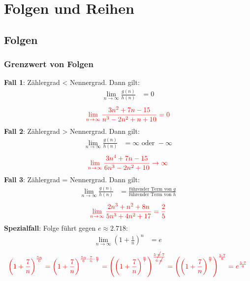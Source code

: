 \section{Folgen und Reihen}
\subsection{Folgen}

\subsubsection{Grenzwert von Folgen}
\textbf{Fall 1}: Zählergrad < Nennergrad. Dann gilt:
\begin{align*}
	\lim_{n \to \infty} \frac{g(n)}{h(n)} & = 0
\end{align*}
\begin{align*}
	\textcolor{red}{\lim_{n \to \infty} \frac{3n^2 + 7n - 15}{n^3 - 2n^2 + n + 10} = 0}
\end{align*}
\textbf{Fall 2}: Zählergrad > Nennergrad. Dann gilt:
\begin{align*}
	\lim_{n \to \infty} \frac{g(n)}{h(n)} & = \infty \text{ oder } -\infty
\end{align*}
\begin{align*}
	\textcolor{red}{\lim_{n \to \infty} \frac{3n^4 + 7n - 15}{6n^3 - 2n^2 + 10} \to \infty}
\end{align*}
\textbf{Fall 3}: Zählergrad = Nennergrad. Dann gilt:
\begin{align*}
	\lim_{n \to \infty} \frac{g(n)}{h(n)} & = \frac{\text{führender Term von } g}{\text{führender Term von } h}
\end{align*}
\begin{align*}
	\textcolor{red}{\lim_{n \to \infty} \frac{2n^3 + n^2 + 8n}{5n^3 + 4n^2 + 17} = \frac{2}{5}}
\end{align*}
\textbf{Spezialfall}: Folge führt gegen $e \approx 2.718$:
\begin{align*}
	\lim_{n \to \infty} (1+\frac{1}{n})^n & = e
\end{align*}
\begin{align*}
	\textcolor{red}{\left(1 + \frac{7}{n}\right)^{\frac{5n}{6}} = \left(1 + \frac{7}{n}\right)^{\frac{5n}{6} \cdot \frac{7}{n} \cdot \frac{n}{7}} = \left(\left(1 + \frac{7}{n}\right)^{\frac{n}{7}}\right)^{\frac{5 \cdot \cancel{n}\cdot 7}{6 \cdot \cancel{n}}} = \left(\left(1 + \frac{7}{n}\right)^{\frac{n}{7}}\right)^{\frac{5 \cdot 7}{6}} = e^{\frac{5 \cdot 7}{6}}}
\end{align*}

